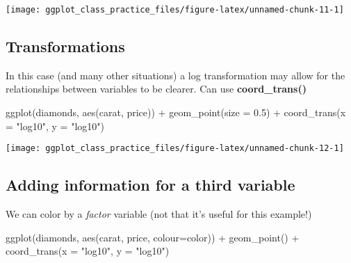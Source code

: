 \documentclass[
]{article}
\newenvironment{Shaded}{\begin{snugshade}}{\end{snugshade}}
\newcommand{\AttributeTok}[1]{\textcolor[rgb]{0.77,0.63,0.00}{#1}}
\newcommand{\FloatTok}[1]{\textcolor[rgb]{0.00,0.00,0.81}{#1}}
\newcommand{\FunctionTok}[1]{\textcolor[rgb]{0.00,0.00,0.00}{#1}}
\newcommand{\NormalTok}[1]{#1}
\newcommand{\SpecialCharTok}[1]{\textcolor[rgb]{0.00,0.00,0.00}{#1}}
\newcommand{\StringTok}[1]{\textcolor[rgb]{0.31,0.60,0.02}{#1}}
\begin{document}
\begin{center}\texttt{[image: ggplot\_class\_practice\_files/figure-latex/unnamed-chunk-11-1]} \end{center}

\hypertarget{transformations}{%
\subsection{Transformations}\label{transformations}}

In this case (and many other situations) a log transformation may allow
for the relationships between variables to be clearer. Can use
\textbf{coord\_trans()}

\begin{Shaded}
\begin{Highlighting}[]
\FunctionTok{ggplot}\NormalTok{(diamonds, }\FunctionTok{aes}\NormalTok{(carat, price)) }\SpecialCharTok{+} \FunctionTok{geom\_point}\NormalTok{(}\AttributeTok{size =} \FloatTok{0.5}\NormalTok{) }\SpecialCharTok{+}
\FunctionTok{coord\_trans}\NormalTok{(}\AttributeTok{x =} \StringTok{"log10"}\NormalTok{, }\AttributeTok{y =} \StringTok{"log10"}\NormalTok{)}
\end{Highlighting}
\end{Shaded}

\begin{center}\texttt{[image: ggplot\_class\_practice\_files/figure-latex/unnamed-chunk-12-1]} \end{center}

\hypertarget{adding-information-for-a-third-variable}{%
\subsection{Adding information for a third
variable}\label{adding-information-for-a-third-variable}}

We can color by a \emph{factor} variable (not that it's useful for this
example!)

\begin{Shaded}
\begin{Highlighting}[]
\FunctionTok{ggplot}\NormalTok{(diamonds, }\FunctionTok{aes}\NormalTok{(carat, price, }\AttributeTok{colour=}\NormalTok{color)) }\SpecialCharTok{+} \FunctionTok{geom\_point}\NormalTok{() }\SpecialCharTok{+} 
    \FunctionTok{coord\_trans}\NormalTok{(}\AttributeTok{x =} \StringTok{"log10"}\NormalTok{, }\AttributeTok{y =} \StringTok{"log10"}\NormalTok{)}
\end{Highlighting}
\end{Shaded}
\end{document}
